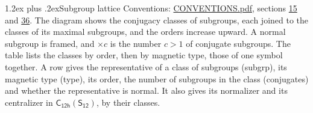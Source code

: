 \documentclass[10pt,a4paper]{article}
\makeatletter
\renewcommand\section{\@startsection{section}{1}{\z@}{-3ex plus -1ex minus -.2ex}%
  {1.2ex plus .2ex}{\normalfont\large\sffamily\bfseries\color{parttitle}}}
\numberwithin{equation}{section}
\newcommand{\grp}[1]{\mathsf{#1}}
\makeatother
\begin{document}
\section{Subgroup lattice}\label{s:subgroups}
Conventions: \href{../../CONVENTIONS.pdf}{CONVENTIONS.pdf}, sections \href{../../../rotation/CONVENTIONS.pdf\#conv.15}{15} and \href{../../CONVENTIONS.pdf\#conv.36}{36}.
The diagram shows the conjugacy classes of subgroups, each joined to the classes of its maximal subgroups, and the orders increase upward. \label{n:index.conjugates.c}A normal subgroup is framed, and ${\times}c$ is the number $c > 1$ of conjugate subgroups. The table lists the classes by order, then by magnetic type, those of one symbol together. \label{n:head.subgroup}\label{n:head.magnetic.type}\label{n:head.order}\label{n:head.conjugates}\label{n:head.normal}A row gives the representative of a class of subgroups (subgrp), its magnetic type (type), its order, the number of subgroups in the class (conjugates) and whether the representative is normal. \label{n:head.normalizer}\label{n:head.centralizer}It also gives its normalizer and its centralizer in $\grp{C_{12h}}(\grp{S_{12}})$, by their classes. 
\end{document}
